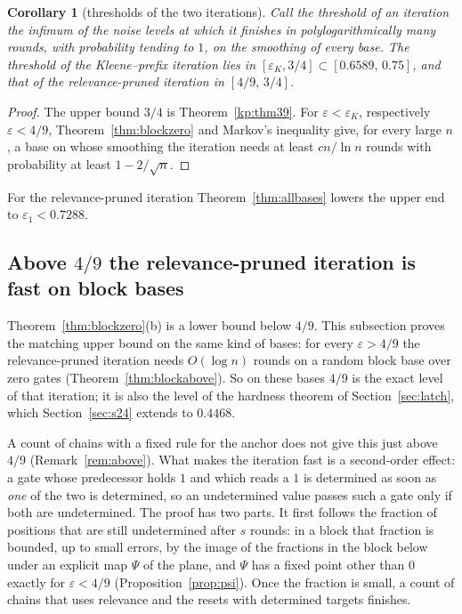 \documentclass[11pt]{amsart}
\newtheorem{corollary}[theorem]{Corollary}
\theoremstyle{definition}
\theoremstyle{remark}
\newcommand{\eps}{\varepsilon}
\begin{document}
\begin{corollary}[thresholds of the two iterations]\label{cor:thresholds}
Call the threshold of an iteration the infimum of the noise levels at which it finishes in
polylogarithmically many rounds, with probability tending to $1$, on the smoothing of every base. The threshold of the Kleene--prefix iteration lies in
$[\eps_K,3/4]\subset[0.6589,\,0.75]$, and that of the relevance-pruned iteration in $[4/9,\,3/4]$.
\end{corollary}

\begin{proof}
The upper bound $3/4$ is Theorem~\ref{kp:thm39}. For $\eps<\eps_K$, respectively $\eps<4/9$,
Theorem~\ref{thm:blockzero} and Markov's inequality give, for every large $n$, a base on whose
smoothing the iteration needs at least $cn/\ln n$ rounds with probability at least $1-2/\sqrt n$.
\end{proof}

\noindent For the relevance-pruned iteration Theorem~\ref{thm:allbases} lowers the upper end to
$\eps_1<0.7288$.

\subsection{Above \texorpdfstring{$4/9$}{4/9} the relevance-pruned iteration is fast on block bases}\label{sec:above}

Theorem~\ref{thm:blockzero}(b) is a lower bound below $4/9$. This subsection proves the matching
upper bound on the same kind of bases: for every $\eps>4/9$ the relevance-pruned iteration needs
$O(\log n)$ rounds on a random block base over zero gates (Theorem~\ref{thm:blockabove}). So on
these bases $4/9$ is the exact level of that iteration; it is also the level of the hardness
theorem of Section~\ref{sec:latch}, which Section~\ref{sec:s24} extends to $0.4468$.

A count of chains with a fixed rule for the anchor does not give this just above $4/9$
(Remark~\ref{rem:above}). What makes the iteration fast is a second-order effect: a gate whose
predecessor holds $1$ and which reads a $1$ is determined as soon as \emph{one} of the two is
determined, so an undetermined value passes such a gate only if both are undetermined. The proof
has two parts. It first follows the fraction of positions that are still undetermined after $s$
rounds: in a block that fraction is bounded, up to small errors, by the image of the fractions
in the block below under an explicit map $\Psi$ of the plane, and $\Psi$ has a fixed point other
than $0$ exactly for $\eps<4/9$ (Proposition~\ref{prop:psi}). Once the fraction is small, a
count of chains that uses relevance and the resets with determined targets finishes.
\end{document}
